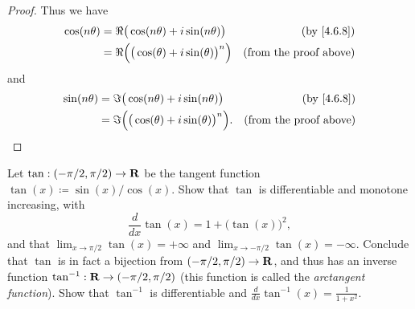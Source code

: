 \begin{proof}
  Thus we have
  \begin{align*}
    \cos(n \theta) & = \Re\big(\cos(n \theta) + i \sin(n \theta)\big)         & \text{(by \cref{4.6.8})}      \\
                   & = \Re\Big(\big(\cos(\theta) + i \sin(\theta)\big)^n\Big) & \text{(from the proof above)}
  \end{align*}
  and
  \begin{align*}
    \sin(n \theta) & = \Im\big(\cos(n \theta) + i \sin(n \theta)\big)          & \text{(by \cref{4.6.8})}      \\
                   & = \Im\Big(\big(\cos(\theta) + i \sin(\theta)\big)^n\Big). & \text{(from the proof above)}
  \end{align*}
\end{proof}

\begin{exercise}\label{ex 4.7.8}
  Let \(\tan : (- \pi / 2, \pi / 2) \to \mathbf{R}\) be the tangent function \(\tan(x) \coloneqq \sin(x) / \cos(x)\).
  Show that \(\tan\) is differentiable and monotone increasing, with
  \[
    \frac{d}{dx} \tan(x) = 1 + \big(\tan(x)\big)^2,
  \]
  and that \(\lim_{x \to \pi / 2} \tan(x) = +\infty\) and \(\lim_{x \to -\pi / 2} \tan(x) = -\infty\).
  Conclude that \(\tan\) is in fact a bijection from \((- \pi / 2, \pi / 2) \to \mathbf{R}\), and thus has an inverse function \(\tan^{-1} : \mathbf{R} \to (- \pi / 2, \pi / 2)\)
  (this function is called the \emph{arctangent function}).
  Show that \(\tan^{-1}\) is differentiable and \(\frac{d}{dx} \tan^{-1}(x) = \frac{1}{1 + x^2}\).
\end{exercise}

